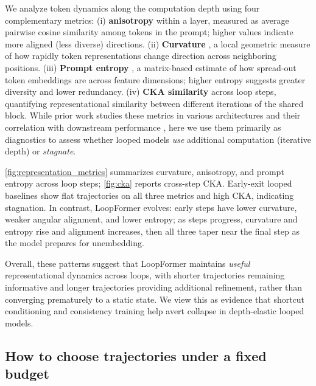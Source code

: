We analyze token dynamics along the computation depth using four complementary metrics:
(i) \textbf{anisotropy} \cite{godey2024anisotropy} within a layer, measured as average pairwise cosine similarity among tokens in the prompt; higher values indicate more aligned (less diverse) directions.
(ii) \textbf{Curvature} \cite{hosseini2023large}, a local geometric measure of how rapidly token representations change direction across neighboring positions.
(iii) \textbf{Prompt entropy} \cite{skean2025layer}, a matrix-based estimate of how spread-out token embeddings are across feature dimensions; higher entropy suggests greater diversity and lower redundancy.
(iv) \textbf{CKA similarity} \cite{kornblith2019similarity} across loop steps, quantifying representational similarity between different iterations of the shared block.
While prior work studies these metrics in various architectures and their correlation with downstream performance \cite{garrido2023rankme, skean2025layer}, here we use them primarily as diagnostics to assess whether looped models \emph{use} additional computation (iterative depth) or \emph{stagnate}.

\autoref{fig:representation_metrics} summarizes curvature, anisotropy, and prompt entropy across loop steps; \autoref{fig:cka} reports cross-step CKA. Early-exit looped baselines show flat trajectories on all three metrics and high CKA, indicating stagnation. In contrast, LoopFormer evolves: early steps have lower curvature, weaker angular alignment, and lower entropy; as steps progress, curvature and entropy rise and alignment increases, then all three taper near the final step as the model prepares for unembedding.


Overall, these patterns suggest that LoopFormer maintains \emph{useful} representational dynamics across loops, with shorter trajectories remaining informative and longer trajectories providing additional refinement, rather than converging prematurely to a static state. We view this as evidence that shortcut conditioning and consistency training help avert collapse in depth-elastic looped models. 



\subsection{How to choose trajectories under a fixed budget}

